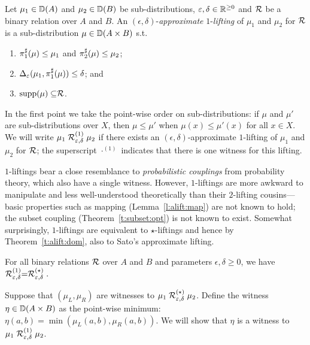 \documentclass{lmcs}
\begin{document}
\begin{defi}
  Let $\mu_1 \in {\mathbb{D}}(A)$ and $\mu_2 \in {\mathbb{D}}(B)$ be sub-distributions,
  $\varepsilon, \delta \in \mathbb{R}^{\geq 0}$ and $\mathrel{\mathcal{R}}$ be a binary relation over $A
$ and $B$. An $(\epsilon, \delta)$-\emph{approximate} $1$-\emph{lifting}
  of $\mu_1$ and $\mu_2$ for $\mathrel{\mathcal{R}}$ is a sub-distribution $\mu \in {\mathbb{D}}(A
  \times B)$ s.t.
  \begin{enumerate}
    \item $\pi_{1}^{\sharp}(\mu) \leq \mu_1$ and $\pi_{2}^{\sharp}(\mu) \leq \mu_2$;
    \item $\Delta_\varepsilon(\mu_1, \pi_{1}^{\sharp}(\mu)) \leq \delta$; and
    \item $\operatorname{supp}(\mu) \subseteq \mathrel{\mathcal{R}}$.
  \end{enumerate}
  In the first point we take the point-wise order on sub-distributions: if $\mu$
  and $\mu'$ are sub-distributions over $X$, then $\mu \leq \mu'$ when $\mu(x)
  \leq \mu'(x)$ for all $x \in X$. We will write
  $
    \mu_1 \mathrel{\mathrel{\mathcal{R}}^{(1)}_{\varepsilon, \delta}} \mu_2
  $
  if there exists an $(\epsilon, \delta)$-approximate $1$-lifting of $\mu_1
$ and $\mu_2$ for $\mathrel{\mathcal{R}}$; the superscript $\cdot^{(1)}$ indicates that
  there is one witness for this lifting.
\end{defi}

$1$-liftings bear a close resemblance to \emph{probabilistic couplings} from
probability theory, which also have a single witness.  However, $1$-liftings are
more awkward to manipulate and less well-understood theoretically than their
$2$-lifting cousins---basic properties such as mapping (Lemma~\ref{l:alift:map})
are not known to hold; the subset coupling (Theorem~\ref{t:subset:opt}) is not
known to exist.  Somewhat surprisingly, $1$-liftings are equivalent to
$\star$-liftings and hence by Theorem~\ref{t:alift:dom}, also to Sato's
approximate lifting.

\begin{thm} \label{t:1-star}
  For all binary relations $\mathrel{\mathcal{R}}$ over $A$ and $B$ and parameters
  $\epsilon, \delta \geq 0$, we have
  $
    \mathrel{\mathrel{\mathcal{R}}^{(1)}_{\varepsilon, \delta}} = \mathrel{\mathrel{\mathcal{R}}^{(\star)}_{\varepsilon, \delta}} .
  $
\end{thm}
\proofatend
  Suppose that $(\mu_L, \mu_R)$ are witnesses to $\mu_1 \mathrel{\mathrel{\mathcal{R}}^{(\star)}_{\varepsilon,
    \delta}} \mu_2$. Define the witness $\eta \in {\mathbb{D}}(A \times B)$ as the
  point-wise minimum: $\eta(a, b) = \min(\mu_L(a, b), \mu_R(a, b))$. We
  will show that $\eta$ is a witness to $\mu_1
  \mathrel{\mathrel{\mathcal{R}}^{(1)}_{\varepsilon,\delta}} \mu_2$.
\end{document}
